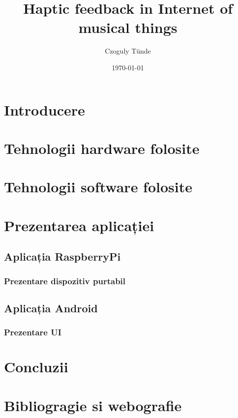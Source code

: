 \documentclass[a4paper, 12pt, titlepage]{article}
\title{Haptic feedback in Internet of musical things}
\author{Czoguly Tünde}
\date{\today}
\begin{document}
\maketitle
\tableofcontents

\newpage

\section{Introducere}


\newpage

\section{Tehnologii hardware folosite}


\newpage

\section{Tehnologii software folosite}


\newpage

\section{Prezentarea aplicației}
\subsection{Aplicația RaspberryPi}
\subsubsection{Prezentare dispozitiv purtabil}
\subsection{Aplicația Android}
\subsubsection{Prezentare UI}

\newpage

\section{Concluzii}

\newpage

\section{Bibliogragie si webografie}


\end{document}

